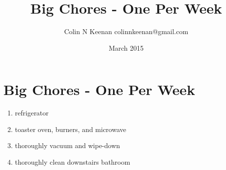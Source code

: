 \documentclass[12pt,letterpaper]{article}
\newcommand{\mytitle}{Big Chores - One Per Week}
\begin{document}
\title{\mytitle{}}
\author{Colin N Keenan colinnkeenan@gmail.com}
\date{March 2015}
\section*{\mytitle{}}
\begin{enumerate}
	\item refrigerator
	\item toaster oven, burners, and microwave
	\item thoroughly vacuum and wipe-down
	\item thoroughly clean downstairs bathroom
\end{enumerate}
\end{document}
